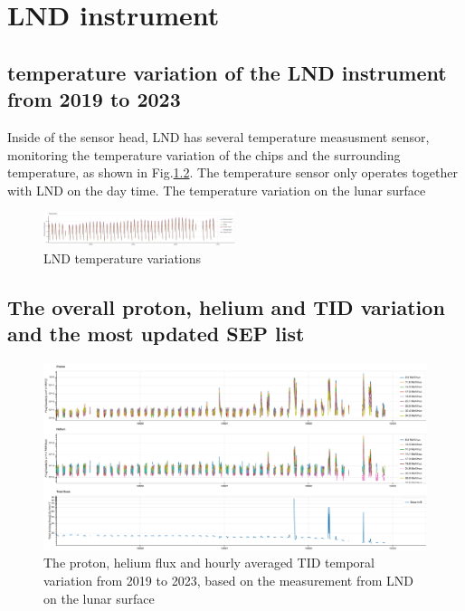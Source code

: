 \chapter{LND instrument}
\label{chp:GCS_Python}

\section{temperature variation of the LND instrument from 2019 to 2023}

Inside of the sensor head, LND has several temperature measusment sensor, monitoring the temperature variation of the chips and the surrounding temperature, as shown in Fig.\ref{}. The temperature sensor only operates together with LND on the day time. 
The temperature variation on the lunar surface

\begin{figure}
    \centering
    \includegraphics[angle = 90, width = 0.5\textwidth, height = \textheight]{images/lnd_temperature.png}
    \caption{LND temperature variations}
    \label{}
\end{figure}

\section{The overall proton, helium and TID variation and the most updated SEP list}

\begin{figure}
    \centering
    \includegraphics[angle = 90, width =\textwidth, height = \textheight]{images/LND-proton-helium-TID.png}
    \caption[The overview variation of proton and helium flux and \ac{TID}]{The proton, helium flux and hourly averaged \ac{TID} temporal variation from 2019 to 2023, based on the measurement from \ac{LND} on the lunar surface}
    \label{Fig:appendix_LND_proton_helium_TID}
\end{figure}


